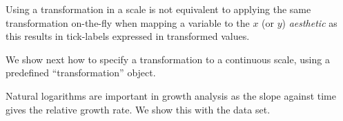 \documentclass[krantz2]{krantz}\usepackage{knitr}%
\begin{document}
\begin{knitrout}\footnotesize
{}\color{fgcolor}\begin{kframe}
\begin{alltt}
  \hlstd{(}\hlstd{=}\hlstd{(}\hlstd{,}\hlstd{,}\hlstd{,}\hlstd{))}
\end{alltt}
\end{kframe}
\end{knitrout}

Using a transformation in a scale is not equivalent to applying the same transformation on-the-fly when mapping a variable to the $x$  (or $y$) \emph{aesthetic} as this results in tick-labels expressed in transformed values.

\begin{knitrout}\footnotesize
{}\color{fgcolor}\begin{kframe}
\begin{alltt}
   \hlopt{+}
  \hlstd{()}
\end{alltt}
\end{kframe}
\end{knitrout}

We show next how to specify a transformation to a continuous scale, using a predefined ``transformation'' object.

\begin{knitrout}\footnotesize
{}\color{fgcolor}\begin{kframe}
\begin{alltt}
  \hlstd{(} \hlstd{=} \hlstd{)}
\end{alltt}
\end{kframe}
\end{knitrout}

Natural logarithms are important in growth analysis as the slope against time gives the relative growth rate. We show this with the  data set.

\begin{knitrout}\footnotesize
{}\color{fgcolor}\begin{kframe}
\begin{alltt}
\hlstd{(} 
       \hlstd{(}      \hlopt{+}
  \hlstd{()} \hlopt{+}
  \hlstd{()} \hlopt{+}
  \hlstd{(} \hlstd{=} \hlstd{,}  \hlstd{=} \hlstd{(}\hlstd{,} \hlstd{,} \hlstd{,} \hlstd{))}
\end{alltt}
\end{kframe}
\end{knitrout}
\end{document}
